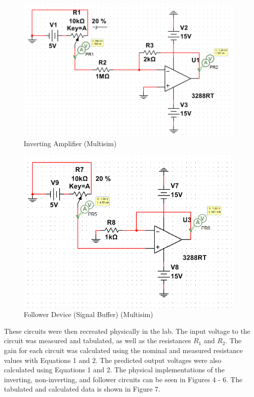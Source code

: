 \documentclass[12pt]{article}
\begin{document}
\bigskip

\begin{figure}[h!] %
   \centering
   \includegraphics[width=5in]{inverting_multisim.PNG} 
   \caption{Inverting Amplifier (Multisim)}
   \label{fig:example}
\end{figure}

\newpage

\begin{figure}[h!] %
   \centering
   \includegraphics[width=4.5in]{follower_multisim.PNG} 
   \caption{Follower Device (Signal Buffer) (Multisim)}
   \label{fig:example}
\end{figure}

\bigskip

These circuits were then recreated physically in the lab. The input voltage to the circuit was measured and tabulated, as well as the resistances $R_{1}$ and $R_{2}$. The gain for each circuit was calculated using the nominal and measured resistance values with Equations 1 and 2. The predicted output voltages were also calculated using Equations 1 and 2.  The physical implementations of the inverting, non-inverting, and follower circuits can be seen in Figures 4 - 6. The tabulated and calculated data is shown in Figure 7.
\bigskip
\end{document}
